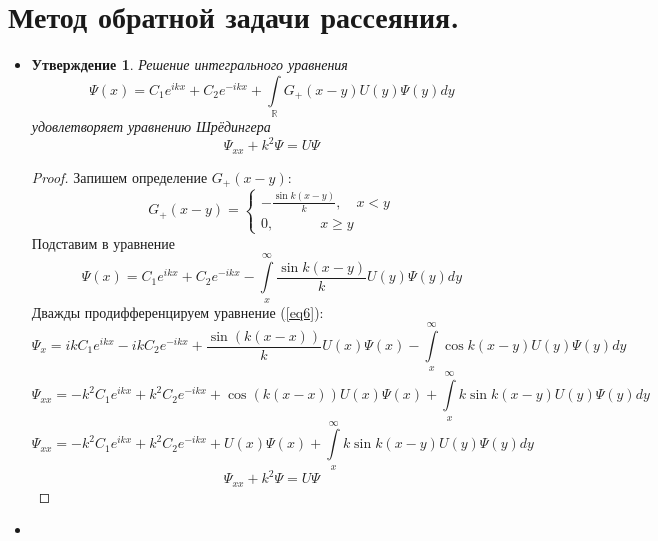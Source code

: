 \documentclass[12pt]{article}
\newtheorem{utv}{Утверждение}
\theoremstyle{definition}
\begin{document}
\section{Метод обратной задачи рассеяния.}
\begin{itemize}
    \item[\textbf{ДЗ 5-1.}]
    \begin{utv}
    Решение интегрального уравнения
    \begin{equation}\label{eq6}
        \Psi(x)=C_1e^{ikx}+C_2e^{-ikx}+\int\limits_\mathbb{R}G_+(x-y)U(y)\Psi(y)dy
    \end{equation}
    удовлетворяет уравнению Шрёдингера
    \begin{equation}
        \Psi_{xx}+k^2\Psi=U\Psi
    \end{equation}
    \end{utv}
    \begin{proof}
    Запишем определение $G_+(x-y)$:
    \begin{equation}
        G_+(x-y)=\left\{
        \begin{array}{l}
        -\frac{\sin k(x-y)}{k},\quad x<y\\
        0,\quad\quad\quad\; x\geq y
        \end{array}
        \right.
    \end{equation}
    Подставим в уравнение 
    \begin{equation}\label{eq6}
        \Psi(x)=C_1e^{ikx}+C_2e^{-ikx}-\int\limits_x^\infty \frac{\sin k(x-y)}{k}U(y)\Psi(y)dy
    \end{equation}
    Дважды продифференцируем уравнение (\ref{eq6}):
    \begin{equation}
        \Psi_x=ikC_1e^{ikx}-ikC_2e^{-ikx}+\frac{\sin(k(x-x))}{k}U(x)\Psi(x)-\int\limits_x^\infty \cos k(x-y)U(y)\Psi(y)dy
    \end{equation}
    \begin{equation}
        \Psi_{xx}=-k^2C_1e^{ikx}+k^2C_2e^{-ikx}+\cos(k(x-x))U(x)\Psi(x)+\int\limits_x^\infty k\sin k(x-y)U(y)\Psi(y)dy
    \end{equation}
    \begin{equation}
        \Psi_{xx}=-k^2C_1e^{ikx}+k^2C_2e^{-ikx}+U(x)\Psi(x)+\int\limits_x^\infty k\sin k(x-y)U(y)\Psi(y)dy
    \end{equation}
    \begin{equation}
        \Psi_{xx}+k^2\Psi=U\Psi
    \end{equation}
    \end{proof}
    \item[\textbf{ДЗ 5-2.}]

\end{itemize}
\end{document}

